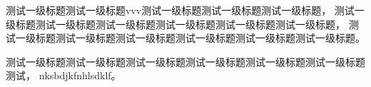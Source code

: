     测试一级标题测试一级标题vvv测试一级标题测试一级标题测试一级标题，
    测试一级标题测试一级标题测试一级标题测试一级标题测试一级标题测试一级标题，
    测试一级标题测试一级标题测试一级标题测试一级标题测试一级标题测试一级标题。

    测试一级标题测试一级标题测试一级标题测试一级标题测试一级标题测试一级标题测试，
    nksbdjkfnhlsdklf。
